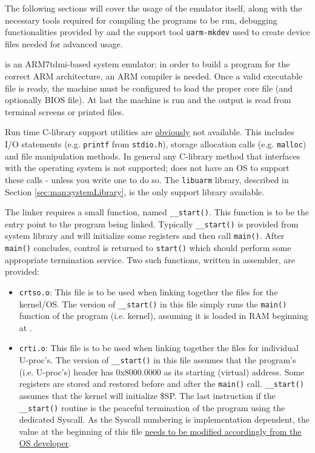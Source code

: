 
The following sections will cover the usage of the emulator itself, along with the necessary tools required for compiling the programs to be run, debugging functionalities provided by \uarm{} and the support tool \texttt{uarm-mkdev} used to create device files needed for advanced usage.


\uarm{} is an ARM7tdmi-based system emulator; in order to build a program for the correct ARM architecture, an ARM compiler is needed.
Once a valid executable file is ready, the machine must be configured to load the proper core file (and optionally BIOS file).
At last the machine is run and the output is read from terminal screens or printed files.

\label{sec:man:development}
Run time C-library support utilities are \uline{obviously} not available. 
This includes I/O statements (e.g. \texttt{printf} from \texttt{stdio.h}), storage allocation calls (e.g. \texttt{malloc}) and file manipulation methods.
In general any C-library method that interfaces with the operating system is not supported; \uarm{} does not have an OS to support these calls - unless you write one to do so. 
The \texttt{libuarm} library, described in Section \ref{sec:man:systemLibrary}, is the only support library available.

The \uarm{} linker requires a small function, named \texttt{\_\_start()}. 
This function is to be the entry point to the program being linked.
Typically \texttt{\_\_start()} is provided from system library and will initialize some registers and then call \texttt{main()}.
After \texttt{main()} concludes, control is returned to \texttt{start()} which should perform some appropriate termination service. 
Two such functions, written in assembler, are provided:
\begin{itemize}
\item \texttt{crtso.o}: This file is to be used when linking together the files for the kernel/OS. 
The version of \texttt{\_\_start()} in this file simply runs the \texttt{main()} function of the program (i.e. kernel), assuming it is loaded in RAM beginning at . 

\item \texttt{crti.o}: This file is to be used when linking together the files for individual U-proc’s. 
The version of \texttt{\_\_start()} in this file assumes that the program’s (i.e. U-proc’s) header has 0x8000.0000 as its starting (virtual) address. 
Some registers are stored and restored before and after the \texttt{main()} call. 
\texttt{\_\_start()} assumes that the kernel will initialize \$SP.
The last instruction if the \texttt{\_\_start()} routine is the peaceful termination of the program using the dedicated Syscall.
As the Syscall numbering is implementation dependent, the value at the beginning of this file \uline{needs to be modified accordingly from the OS developer}.
\end{itemize}

